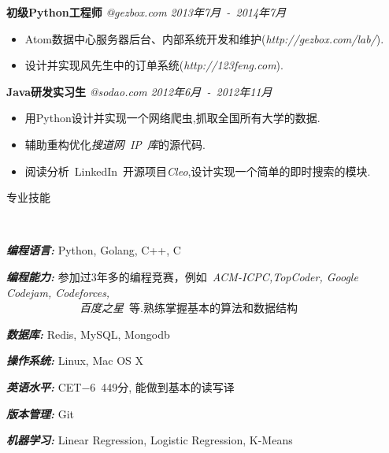 ﻿\documentclass[9pt]{article}
\newenvironment{changemargin}[2]{%
  \begin{list}{}{%
    \setlength{\topsep}{0pt}%
    \setlength{\leftmargin}{#1}%
    \setlength{\rightmargin}{#2}%
    \setlength{\listparindent}{\parindent}%
    \setlength{\itemindent}{\parindent}%
    \setlength{\parsep}{\parskip}%
  }%
  \item[]}{\end{list}
}
\newcommand{\lineover}{
	\begin{changemargin}{-0.05in}{-0.05in}
		\vspace*{-8pt}
		\hrulefill \\
		\vspace*{-2pt}
	\end{changemargin}
}
\newcommand{\header}[1]{
	\begin{changemargin}{-0.5in}{-0.5in}
		\scshape{#1}\\
  	\lineover
	\end{changemargin}
}
\newenvironment{body} {
	\vspace*{-16pt}
	\begin{changemargin}{-0.25in}{-0.5in}
  }	
	{\end{changemargin}
}
\begin{document}
\begin{body}
    \textbf{初级Python工程师} \emph{@gezbox.com} \hfill \emph{2013年7月~-~2014年7月}\\
    \vspace*{-4pt}
    \begin{itemize} \itemsep -0pt  %
        \item Atom数据中心服务器后台、内部系统开发和维护(\emph{http://gezbox.com/lab/}).
        \item 设计并实现风先生中的订单系统(\emph{http://123feng.com}).
    \end{itemize}

    \textbf{Java研发实习生} \emph{@sodao.com} \hfill \emph{2012年6月~-~2012年11月}\\
    \vspace*{-4pt}
    \begin{itemize} \itemsep -0pt  %
        \item 用Python设计并实现一个网络爬虫,抓取全国所有大学的数据.
        \item 辅助重构优化\emph{搜道网~IP~库}的源代码.
        \item 阅读分析~LinkedIn~开源项目\emph{Cleo},设计实现一个简单的即时搜索的模块.
    \end{itemize}

\end{body}

\smallskip


\header{专业技能}

\begin{body}
	\vspace{14pt}
	\emph{\textbf{编程语言:}}{} Python, Golang, C++, C \\
	\medskip

    \emph{\textbf{编程能力:}}{} 参加过3年多的编程竞赛，例如~\emph{ACM-ICPC,TopCoder, Google Codejam, Codeforces, \\ ~~~~~~~~~~~~~百度之星}~等.熟练掌握基本的算法和数据结构\\
	\medskip

    \emph{\textbf{数据库:}}{} Redis, MySQL, Mongodb \\
    \medskip

	\emph{\textbf{操作系统:}}{} Linux, Mac OS X\\
    \medskip

    \emph{\textbf{英语水平:}}{} CET$-$6~449分, 能做到基本的读写译\\
    \medskip

    \emph{\textbf{版本管理:}}{} Git\\
    \medskip

    \emph{\textbf{机器学习:}}{} Linear Regression, Logistic Regression, K-Means

\end{body}
\end{document}

